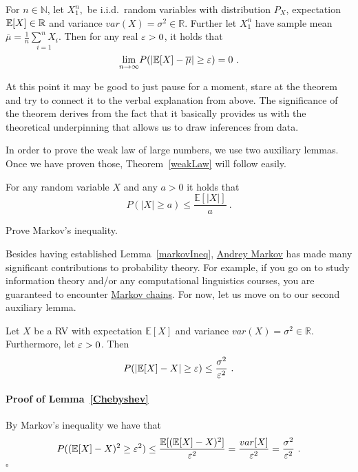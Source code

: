 \begin{Theorem}\label{weakLaw}
For $n \in \mathbb{N}$, let $X_{1}^{n},$ be  i.i.d.~random variables with distribution $ P_{X} $, expectation $ \mathbb{E}[X] \in \mathbb{R} $
and variance $ var(X) = \sigma^{2} \in \mathbb{R} $. Further let
$ X_{1}^{n} $ have sample mean $ \overline{\mu} = \frac{1}{n} \underset{i=1}{\overset{n}{\sum}X_{i}} $. Then for any real $ \varepsilon > 0 $, it holds that 
$$ \underset{n \rightarrow \infty}{\lim}P(|\mathbb{E}[X] - \overline{\mu}| \geq \eps) = 0 \ . $$
\end{Theorem}

At this point it may be good to just pause for a moment, stare at the theorem and try to connect it to the verbal explanation from above. The significance of the theorem
derives from the fact that it basically provides us with the theoretical underpinning that allows us to draw inferences from data.

In order to prove the weak law of large numbers, we use two auxiliary lemmas. Once we have proven those, Theorem~\ref{weakLaw} will follow easily. 

\begin{Lemma}\label{markovIneq}
For any random variable $ X $ and any $ a>0 $ it holds that
$$ P(|X| \geq a) \leq \dfrac{\mathbb{E}[|X|]}{a} \ . $$
\end{Lemma}

\begin{Exercise}
Prove Markov's inequality.
\end{Exercise}

Besides having established Lemma~\ref{markovIneq}, \href{https://en.wikipedia.org/wiki/Andrey_Markov}{Andrey Markov} has made many significant contributions to
probability theory. For example, if you go on to study information theory and/or any computational linguistics courses, you are guaranteed to encounter \href{https://en.wikipedia.org/wiki/Markov_chain}{Markov chains}. For now, let us move on to our second auxiliary lemma.

\begin{Lemma}\label{Chebyshev}
Let $ X $ be a RV with expectation $ \mathbb{E}[X] $ and variance $ var(X) = \sigma^{2} \in \mathbb{R} $. Furthermore, let $ \varepsilon > 0 $. Then
$$ P( \left|\mathbb{E}[X] - X \right| \geq \varepsilon) \leq \dfrac{\sigma^{2}}{\varepsilon^{2}} \ . $$ 
\end{Lemma}

\paragraph{Proof of Lemma~\ref{Chebyshev}} 
By Markov's inequality we have that
\begin{equation}
P((\mathbb{E}[X] - X)^{2} \geq \varepsilon^{2}) \leq \frac{\mathbb{E}[(\mathbb{E}[X]-X)^2]}{\varepsilon^2} = \dfrac{var[X]}{\varepsilon^{2}} = \dfrac{\sigma^{2}}{\varepsilon^{2}} \ .
\end{equation}  
\hfill $ \square $ \bigskip

